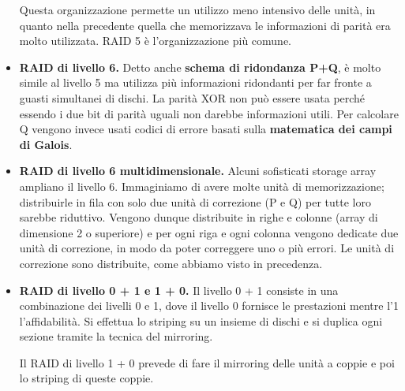 \begin{itemize}
            Questa organizzazione permette un utilizzo meno intensivo delle unità, in quanto nella precedente quella che memorizzava le informazioni di parità era molto utilizzata. RAID 5 è l'organizzazione più comune.
            
            \item \textbf{RAID di livello 6.} Detto anche \textbf{schema di ridondanza P+Q}, è molto simile al livello 5 ma utilizza più informazioni ridondanti per far fronte a guasti simultanei di dischi. La parità XOR non può essere usata perché essendo i due bit di parità uguali non darebbe informazioni utili. Per calcolare Q vengono invece usati codici di errore basati sulla \textbf{matematica dei campi di Galois}.
            
            \item \textbf{RAID di livello 6 multidimensionale.} Alcuni sofisticati storage array ampliano il livello 6. Immaginiamo di avere molte unità di memorizzazione; distribuirle in fila con solo due unità di correzione (P e Q) per tutte loro sarebbe riduttivo. Vengono dunque distribuite in righe e colonne (array di dimensione 2 o superiore) e per ogni riga e ogni colonna vengono dedicate due unità di correzione, in modo da poter correggere uno o più errori. Le unità di correzione sono distribuite, come abbiamo visto in precedenza.
            
            \item \textbf{RAID di livello 0 + 1 e 1 + 0.} Il livello 0 + 1 consiste in una combinazione dei livelli 0 e 1, dove il livello 0 fornisce le prestazioni mentre l'1 l'affidabilità. Si effettua lo striping su un insieme di dischi e si duplica ogni sezione tramite la tecnica del mirroring.
            
            Il RAID di livello 1 + 0 prevede di fare il mirroring delle unità a coppie e poi lo striping di queste coppie.
        \end{itemize}
        
